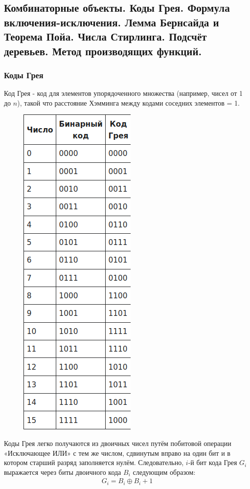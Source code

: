\subsection{Комбинаторные объекты. Коды Грея. Формула включения-исключения. Лемма Бернсайда и Теорема Пойа. Числа Стирлинга. Подсчёт деревьев. Метод производящих функций.}

\subsubsection{Коды Грея}
Код Грея - код для элементов упорядоченного множества (например, чисел от 1 до $n$), такой что расстояние Хэмминга между кодами соседних элементов = 1.
\begin{figure}[H]
	\centering
	\includegraphics[scale=0.4]{images/grey.png}
\end{figure}

Коды Грея легко получаются из двоичных чисел путём побитовой операции «Исключающее ИЛИ» с тем же числом, сдвинутым вправо на один бит и в котором старший разряд заполняется нулём. Следовательно, $i$-й бит кода Грея $G_i$ выражается через биты двоичного кода $B_i$ следующим образом:
\begin{align*}
G_i = B_i \oplus B_i + 1
\end{align*}

